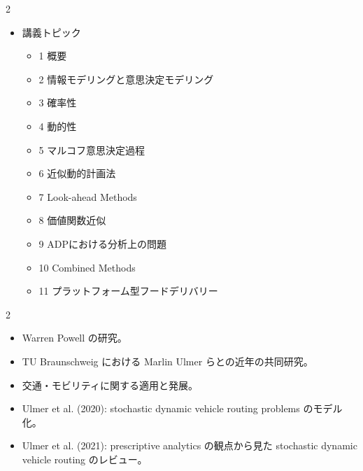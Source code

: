 \clearpage
{}
\begin{multicols}{2}\scriptsize\raggedcolumns
{}
\begin{itemize}
\item 講義トピック
\begin{itemize}
\item 1 概要
\item 2 情報モデリングと意思決定モデリング
\item 3 確率性
\item 4 動的性
\item 5 マルコフ意思決定過程
\item 6 近似動的計画法
\item 7 Look-ahead Methods
\item 8 価値関数近似
\item 9 ADPにおける分析上の問題
\item 10 Combined Methods
\item 11 プラットフォーム型フードデリバリー
\end{itemize}
\end{itemize}
\end{multicols}

\clearpage
{}
\begin{multicols}{2}\scriptsize\raggedcolumns
{}
\begin{itemize}
\item Warren Powell の研究。
\item TU Braunschweig における Marlin Ulmer らとの近年の共同研究。
\item 交通・モビリティに関する適用と発展。
\item Ulmer et al. (2020): stochastic dynamic vehicle routing problems のモデル化。
\item Ulmer et al. (2021): prescriptive analytics の観点から見た stochastic dynamic vehicle routing のレビュー。
\end{itemize}
\end{multicols}

